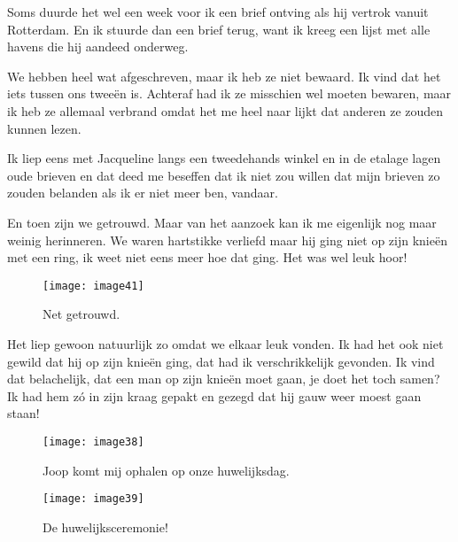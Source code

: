Soms duurde het wel een week voor ik een brief ontving als hij vertrok vanuit Rotterdam. En ik stuurde dan een brief terug, want ik kreeg een lijst met alle havens die hij aandeed onderweg. 

We hebben heel wat afgeschreven, maar ik heb ze niet bewaard. Ik vind dat het iets tussen ons twee\"{e}n is. Achteraf had ik ze misschien wel moeten bewaren, maar ik heb ze allemaal verbrand omdat het me heel naar lijkt dat anderen ze zouden kunnen lezen. 

Ik liep eens met Jacqueline langs een tweedehands winkel en in de etalage lagen oude brieven en dat deed me beseffen dat ik niet zou willen dat mijn brieven zo zouden belanden als ik er niet meer ben, vandaar.


En toen zijn we getrouwd. Maar van het aanzoek kan ik me eigenlijk nog maar weinig herinneren. We waren hartstikke verliefd maar hij ging niet op zijn knie\"{e}n met een ring, ik weet niet eens meer hoe dat ging. Het was wel leuk hoor! 

\begin{figure}[h]
    \texttt{[image: image41]}
    \caption{Net getrouwd.}
\end{figure}

Het liep gewoon natuurlijk zo omdat we elkaar leuk vonden. Ik had het ook niet gewild dat hij op zijn knie\"{e}n ging, dat had ik verschrikkelijk gevonden. Ik vind dat belachelijk, dat een man op zijn knie\"{e}n moet gaan, je doet het toch samen? Ik had hem z\'{o} in zijn kraag gepakt en gezegd dat hij gauw weer moest gaan staan!

\begin{figure}[h]
    \begin{centering}
    \texttt{[image: image38]}
    \caption{Joop komt mij ophalen op onze huwelijksdag.}
    \end{centering}
\end{figure}

\begin{figure}[h]
    \begin{centering}
    \texttt{[image: image39]}
    \caption{De huwelijksceremonie!}
    \end{centering}
\end{figure}



